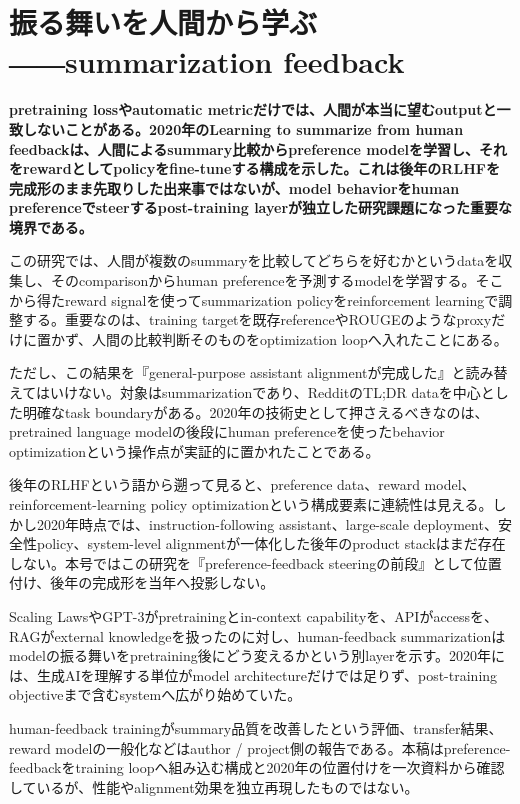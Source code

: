 \section{振る舞いを人間から学ぶ――summarization feedback}
\noindent\textbf{pretraining lossやautomatic metricだけでは、人間が本当に望むoutputと一致しないことがある。2020年のLearning to summarize from human feedbackは、人間によるsummary比較からpreference modelを学習し、それをrewardとしてpolicyをfine-tuneする構成を示した。これは後年のRLHFを完成形のまま先取りした出来事ではないが、model behaviorをhuman preferenceでsteerするpost-training layerが独立した研究課題になった重要な境界である。}\autocite{src-8622fc1e22c2,src-e5838d162a66}

この研究では、人間が複数のsummaryを比較してどちらを好むかというdataを収集し、そのcomparisonからhuman preferenceを予測するmodelを学習する。そこから得たreward signalを使ってsummarization policyをreinforcement learningで調整する。重要なのは、training targetを既存referenceやROUGEのようなproxyだけに置かず、人間の比較判断そのものをoptimization loopへ入れたことにある。\autocite{src-8622fc1e22c2,src-e5838d162a66}


ただし、この結果を『general-purpose assistant alignmentが完成した』と読み替えてはいけない。対象はsummarizationであり、RedditのTL;DR dataを中心とした明確なtask boundaryがある。2020年の技術史として押さえるべきなのは、pretrained language modelの後段にhuman preferenceを使ったbehavior optimizationという操作点が実証的に置かれたことである。\autocite{src-8622fc1e22c2,src-e5838d162a66}


後年のRLHFという語から遡って見ると、preference data、reward model、reinforcement-learning policy optimizationという構成要素に連続性は見える。しかし2020年時点では、instruction-following assistant、large-scale deployment、安全性policy、system-level alignmentが一体化した後年のproduct stackはまだ存在しない。本号ではこの研究を『preference-feedback steeringの前段』として位置付け、後年の完成形を当年へ投影しない。\autocite{src-8622fc1e22c2,src-e5838d162a66}


Scaling LawsやGPT-3がpretrainingとin-context capabilityを、APIがaccessを、RAGがexternal knowledgeを扱ったのに対し、human-feedback summarizationはmodelの振る舞いをpretraining後にどう変えるかという別layerを示す。2020年には、生成AIを理解する単位がmodel architectureだけでは足りず、post-training objectiveまで含むsystemへ広がり始めていた。\autocite{src-8622fc1e22c2,src-e5838d162a66}


\begin{claimboundary}
human-feedback trainingがsummary品質を改善したという評価、transfer結果、reward modelの一般化などはauthor / project側の報告である。本稿はpreference-feedbackをtraining loopへ組み込む構成と2020年の位置付けを一次資料から確認しているが、性能やalignment効果を独立再現したものではない。\autocite{src-8622fc1e22c2,src-e5838d162a66}
\end{claimboundary}
